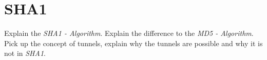 \chapter{SHA1}
Explain the \textit{SHA1 - Algorithm}. Explain the difference to the \textit{MD5 - Algorithm}.
Pick up the concept of tunnels, explain why the tunnels are possible and why it is not in \textit{SHA1}.
